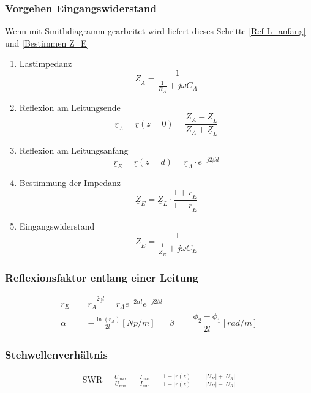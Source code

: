 \subsubsection{Vorgehen Eingangswiderstand}
Wenn mit Smithdiagramm gearbeitet wird liefert dieses Schritte \ref{Ref L_anfang} und \ref{Bestimmen Z_E}
\begin{enumerate}
    \item Lastimpedanz
          \[ \underline{Z}_A = \dfrac{1}{\frac{1}{R_A} + j \omega C_A} \]
    \item Reflexion am Leitungsende
          \[ \underline{r}_A = \underline{r}(z=0) = \dfrac{Z_A - \underline{Z}_L}{Z_A + \underline{Z}_L} \]
    \item Reflexion am Leitungsanfang \label{Ref L_anfang}
          \[ \underline{r}_E = \underline{r}(z=d) =  \underline{r}_A \cdot e^{-j 2 \beta d}\]
    \item Bestimmung der Impedanz \label{Bestimmen Z_E}
          \[ \underline{Z}_E = \underline{Z}_L \cdot \dfrac{1 + \underline{r}_E}{1 - \underline{r}_E}\]
    \item Eingangswiderstand
          \[ \underline{Z}_E = \dfrac{1}{\frac{1}{\underline{Z}_E} + j \omega C_E}\]
\end{enumerate}


\subsubsection{Reflexionsfaktor entlang einer Leitung}
\begin{align*}
    r_E    & = r_A  ^{-2\underline{\gamma} l} = r_A  e^{-2\alpha l} e^{-j2\beta l}                                                     \\
    \alpha & = -\frac{\ln(r_A)}{2l} [\si{Np/m}]                                    & \beta & = \dfrac{\phi_2 -\phi_1}{2l} [\si{rad/m}]
\end{align*}

\subsubsection{Stehwellenverhältnis}
\begin{align*}
    \mathrm{SWR} = \frac{U_\text{max}}{U_\text{min}} =
    \frac{I_\text{max}}{I_\text{min}} = \frac{1+|r(z)|}{1-|r(z)|} =
    \frac{|U_H|+|U_R|}{|U_H|-|U_R|}
\end{align*}

